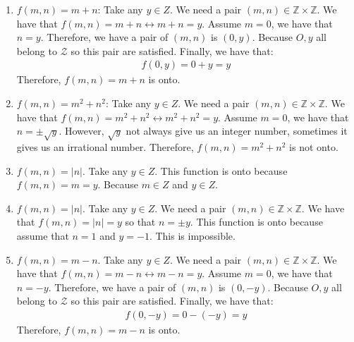 \documentclass{article}
\theoremstyle{mytheoremstyle}
\theoremstyle{mytheoremstyle}
\theoremstyle{myproblemstyle}
\begin{document}
        \begin{enumerate} [label = (\alph*)]
            \item \(f(m,n) = m + n\): Take any \(y \in Z \). We need a pair \((m, n) \in \mathbb{Z}\times\mathbb{Z}\).
            We have that \(f(m, n) = m + n \leftrightarrow m + n = y\). Assume \(m = 0\), we have that \(n = y\).
            Therefore, we have a pair of \((m, n)\) is \((0, y)\). Because \(O, y\) all belong to \(\mathcal{Z}\) so
            this pair are satisfied. Finally, we have that:
            \begin{align*}
                f(0, y) = 0 + y = y  
            \end{align*}
            Therefore, \(f(m,n) = m + n\) is onto.
            \item \(f(m,n) = m^2 + n^2\): Take any \(y \in Z\). We need a pair \((m, n) \in \mathbb{Z}\times\mathbb{Z}\).
            We have that \(f(m, n) = m^2 + n^2 \leftrightarrow m^2 + n^2 = y\). Assume \(m = 0\), we have that \(n = \pm\sqrt{y}\).
            However, \(\sqrt{y}\) not always give us an integer number, sometimes it gives us an irrational number. Therefore,
            \(f(m,n) = m^2 + n^2\) is not onto.
            \item \(f(m,n) = |n|\). Take any \(y \in Z\). This function is onto because \(f(m,n) = m = y\). Because \(m \in Z\) and \(y \in Z\).
            \item \(f(m,n) = |n|\). Take any \(y \in Z\). We need a pair \((m, n) \in \mathbb{Z} \times \mathbb{Z}\).
            We have that \(f(m, n) = |n| = y\) so that \(n = \pm y\). This function is onto because assume that \(n = 1\) and \(y = -1\). This is impossible.
            \item \(f(m,n) = m - n\). Take any \(y \in Z \). We need a pair \((m, n) \in \mathbb{Z}\times\mathbb{Z}\).
            We have that \(f(m, n) = m - n \leftrightarrow m - n = y\). Assume \(m = 0\), we have that \(n = -y\).
            Therefore, we have a pair of \((m,n)\) is \((0, -y)\). Because \(O, y\) all belong to \(\mathcal{Z}\) so
            this pair are satisfied. Finally, we have that:
            \begin{align*}
                f(0, -y) = 0 - (-y) = y
            \end{align*}
            Therefore, \(f(m,n) = m - n\) is onto.
         \end{enumerate}
\end{document}

